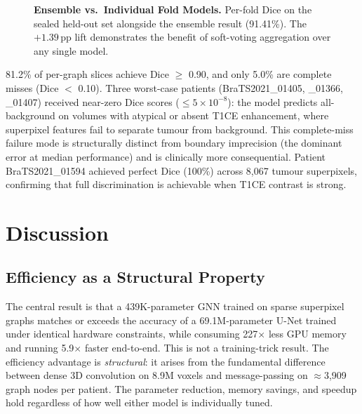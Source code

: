 \documentclass{article}
\begin{document}
\begin{figure}[htbp]
\caption{\textbf{Ensemble vs.\ Individual Fold Models.}
Per-fold Dice on the sealed held-out set alongside the ensemble result (91.41\%).
The $+1.39$\,pp lift demonstrates the benefit of soft-voting aggregation over
any single model.}
\label{fig:ensemble}
\end{figure}

81.2\% of per-graph slices achieve Dice $\geq$ 0.90, and only 5.0\% are complete
misses (Dice $<$ 0.10). Three worst-case patients (BraTS2021\_01405, \_01366,
\_01407) received near-zero Dice scores ($\leq 5\times10^{-8}$): the model predicts
all-background on volumes with atypical or absent T1CE enhancement, where superpixel
features fail to separate tumour from background. This complete-miss failure mode is
structurally distinct from boundary imprecision (the dominant error at median
performance) and is clinically more consequential. Patient BraTS2021\_01594 achieved
perfect Dice (100\%) across 8,067 tumour superpixels, confirming that full
discrimination is achievable when T1CE contrast is strong.

\section{Discussion}
\label{sec:discussion}

\subsection{Efficiency as a Structural Property}

The central result is that a 439K-parameter GNN trained on sparse superpixel graphs
matches or exceeds the accuracy of a 69.1M-parameter U-Net trained under identical
hardware constraints, while consuming 227$\times$ less GPU memory and running
5.9$\times$ faster end-to-end. This is not a training-trick result. The efficiency
advantage is \textit{structural}: it arises from the fundamental difference between
dense 3D convolution on 8.9M voxels and message-passing on $\approx$3,909 graph
nodes per patient. The parameter reduction, memory savings, and speedup hold
regardless of how well either model is individually tuned.
\end{document}
